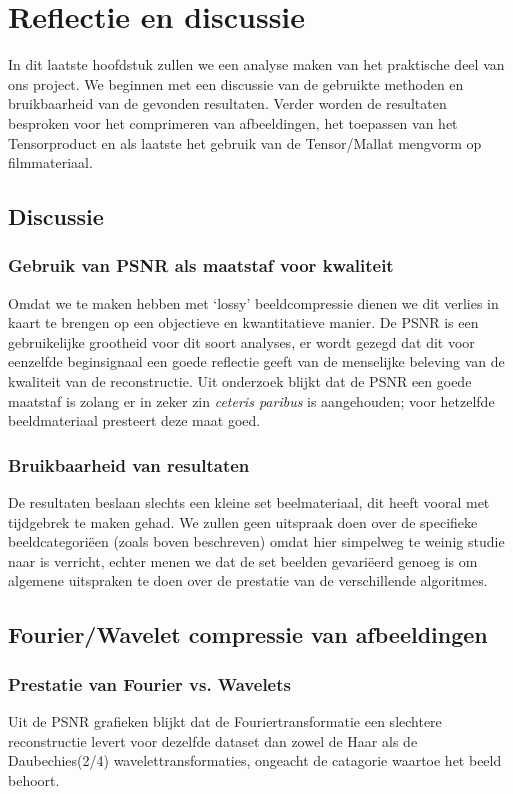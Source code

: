 \chapter{Reflectie en discussie}
\label{discH}
In dit laatste hoofdstuk zullen we een analyse maken van het praktische deel van ons project.
We beginnen met een discussie van de gebruikte methoden en bruikbaarheid van de gevonden resultaten.
Verder worden de resultaten besproken voor het comprimeren van afbeeldingen, het toepassen van het 
Tensorproduct en als laatste het gebruik van de Tensor/Mallat mengvorm op filmmateriaal. 

\section{Discussie}
\subsection{Gebruik van PSNR als maatstaf voor kwaliteit}
Omdat we te maken hebben met `lossy' beeldcompressie dienen we dit verlies in kaart te brengen op een 
objectieve en kwantitatieve manier. 
De PSNR is een gebruikelijke grootheid voor dit soort analyses, er wordt gezegd dat dit voor eenzelfde 
beginsignaal een goede reflectie geeft van de menselijke beleving van de kwaliteit van de reconstructie.
Uit onderzoek\cite{PSNR} blijkt dat de PSNR een goede maatstaf is zolang er in zeker zin \emph{ceteris paribus}
is aangehouden; voor hetzelfde beeldmateriaal presteert deze maat goed.

\subsection{Bruikbaarheid van resultaten}

De resultaten beslaan slechts een kleine set beelmateriaal, dit heeft vooral met tijdgebrek te maken gehad.
We zullen geen uitspraak doen over de specifieke beeldcategori\"een (zoals boven beschreven) 
omdat hier simpelweg te weinig studie naar is verricht, echter menen we dat de set beelden gevari\"eerd 
genoeg is om algemene uitspraken te doen over de prestatie van de verschillende algoritmes.

\section{Fourier/Wavelet compressie van afbeeldingen}

\subsection{Prestatie van Fourier vs. Wavelets}
Uit de PSNR grafieken blijkt dat de Fouriertransformatie een slechtere reconstructie levert voor 
dezelfde dataset dan zowel de Haar als de Daubechies(2/4) wavelettransformaties, 
ongeacht de catagorie waartoe het beeld behoort.


